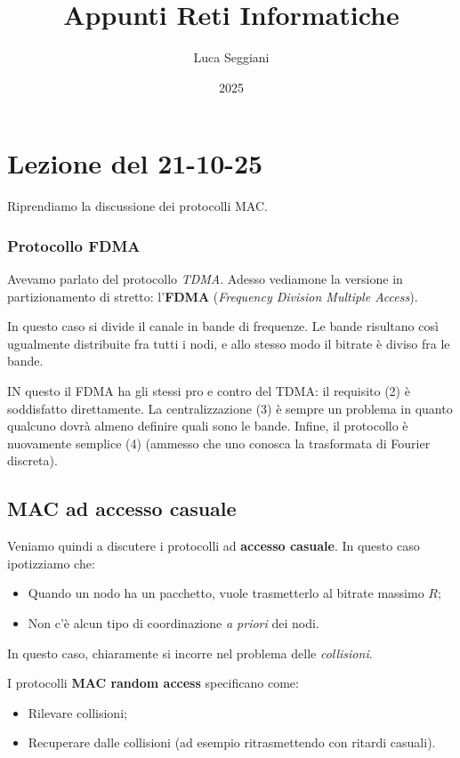 \documentclass[a4paper,11pt]{article}
\title{Appunti Reti Informatiche}
\author{Luca Seggiani}
\date{2025}
\begin{document}
\section{Lezione del 21-10-25}

\thispagestyle{empty}
\pagestyle{fancy}

Riprendiamo la discussione dei protocolli MAC.

\subsubsection{Protocollo FDMA}
Avevamo parlato del protocollo \textit{TDMA}. Adesso vediamone la versione in partizionamento di stretto: l'\textbf{FDMA} (\textit{Frequency Division Multiple Access}).

In questo caso si divide il canale in bande di frequenze. Le bande risultano così ugualmente distribuite fra tutti i nodi, e allo stesso modo il bitrate è diviso fra le bande.

IN questo il FDMA ha gli stessi pro e contro del TDMA: il requisito (2) è soddisfatto direttamente. La centralizzazione (3) è sempre un problema in quanto qualcuno dovrà almeno definire quali sono le bande. Infine, il protocollo è nuovamente semplice (4) (ammesso che uno conosca la trasformata di Fourier discreta). 

\subsection{MAC ad accesso casuale}
Veniamo quindi a discutere i protocolli ad \textbf{accesso casuale}.
In questo caso ipotizziamo che:
\begin{itemize}
	\item Quando un nodo ha un pacchetto, vuole trasmetterlo al bitrate massimo $R$;
	\item Non c'è alcun tipo di coordinazione \textit{a priori} dei nodi.
\end{itemize}

In questo caso, chiaramente si incorre nel problema delle \textit{collisioni}.

I protocolli \textbf{MAC random access} specificano come:
\begin{itemize}
	\item Rilevare collisioni;
	\item Recuperare dalle collisioni (ad esempio ritrasmettendo con ritardi casuali).
\end{itemize}
\end{document}
